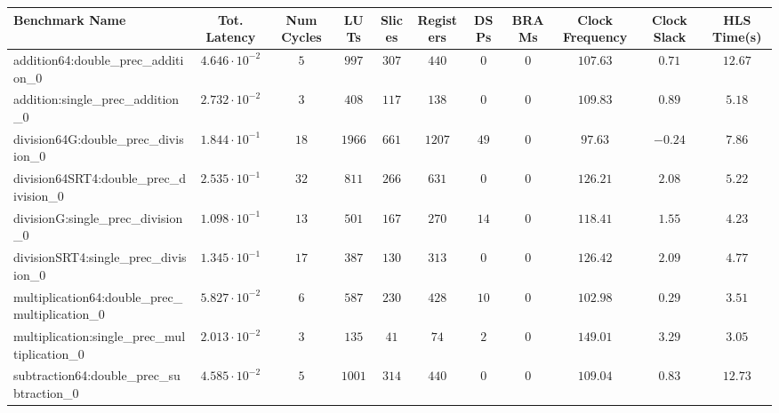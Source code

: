 \begin{tabular}{|l|c|c|c|c|c|c|c|c|c|c|}
\hline
Benchmark Name                                   & Tot. Latency            & Num Cycles & LUTs     & Slices   & Registers & DSPs   & BRAMs & Clock Frequency & Clock Slack & HLS Time(s) \\
\hline
addition64:double\_prec\_addition\_0             & $ 4.646 \cdot 10^{-2} $ & $ 5      $ & $ 997  $ & $ 307  $ & $ 440   $ & $ 0  $ & $ 0 $ & $ 107.63      $ & $ 0.71    $ & $ 12.67   $ \\
addition:single\_prec\_addition\_0               & $ 2.732 \cdot 10^{-2} $ & $ 3      $ & $ 408  $ & $ 117  $ & $ 138   $ & $ 0  $ & $ 0 $ & $ 109.83      $ & $ 0.89    $ & $ 5.18    $ \\
division64G:double\_prec\_division\_0            & $ 1.844 \cdot 10^{-1} $ & $ 18     $ & $ 1966 $ & $ 661  $ & $ 1207  $ & $ 49 $ & $ 0 $ & $ 97.63       $ & $ -0.24   $ & $ 7.86    $ \\
division64SRT4:double\_prec\_division\_0         & $ 2.535 \cdot 10^{-1} $ & $ 32     $ & $ 811  $ & $ 266  $ & $ 631   $ & $ 0  $ & $ 0 $ & $ 126.21      $ & $ 2.08    $ & $ 5.22    $ \\
divisionG:single\_prec\_division\_0              & $ 1.098 \cdot 10^{-1} $ & $ 13     $ & $ 501  $ & $ 167  $ & $ 270   $ & $ 14 $ & $ 0 $ & $ 118.41      $ & $ 1.55    $ & $ 4.23    $ \\
divisionSRT4:single\_prec\_division\_0           & $ 1.345 \cdot 10^{-1} $ & $ 17     $ & $ 387  $ & $ 130  $ & $ 313   $ & $ 0  $ & $ 0 $ & $ 126.42      $ & $ 2.09    $ & $ 4.77    $ \\
multiplication64:double\_prec\_multiplication\_0 & $ 5.827 \cdot 10^{-2} $ & $ 6      $ & $ 587  $ & $ 230  $ & $ 428   $ & $ 10 $ & $ 0 $ & $ 102.98      $ & $ 0.29    $ & $ 3.51    $ \\
multiplication:single\_prec\_multiplication\_0   & $ 2.013 \cdot 10^{-2} $ & $ 3      $ & $ 135  $ & $ 41   $ & $ 74    $ & $ 2  $ & $ 0 $ & $ 149.01      $ & $ 3.29    $ & $ 3.05    $ \\
subtraction64:double\_prec\_subtraction\_0       & $ 4.585 \cdot 10^{-2} $ & $ 5      $ & $ 1001 $ & $ 314  $ & $ 440   $ & $ 0  $ & $ 0 $ & $ 109.04      $ & $ 0.83    $ & $ 12.73   $ \\

\end{tabular}

